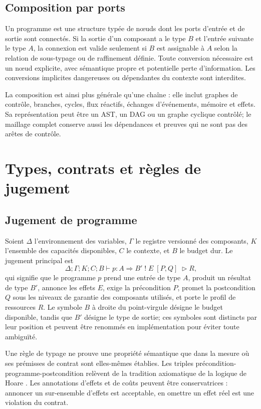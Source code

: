 \documentclass[11pt,a4paper,openany]{book}
\theoremstyle{definition}
\theoremstyle{plain}
\theoremstyle{remark}
\begin{document}
\section{Composition par ports}
Un programme est une structure typée de nœuds dont les ports d'entrée et de sortie sont connectés. Si la sortie d'un composant a le type $B$ et l'entrée suivante le type $A$, la connexion est valide seulement si $B$ est assignable à $A$ selon la relation de sous-typage ou de raffinement définie. Toute conversion nécessaire est un nœud explicite, avec sémantique propre et potentielle perte d'information. Les conversions implicites dangereuses ou dépendantes du contexte sont interdites.

La composition est ainsi plus générale qu'une chaîne : elle inclut graphes de contrôle, branches, cycles, flux réactifs, échanges d'événements, mémoire et effets. Sa représentation peut être un AST, un DAG ou un graphe cyclique contrôlé; le maillage complet conserve aussi les dépendances et preuves qui ne sont pas des arêtes de contrôle.

\chapter{Types, contrats et règles de jugement}
\section{Jugement de programme}
Soient $\Delta$ l'environnement des variables, $\Gamma$ le registre versionné des composants, $K$ l'ensemble des capacités disponibles, $C$ le contexte, et $B$ le budget dur. Le jugement principal est
\[
\Delta;\Gamma;K;C;B\vdash p:A\Rightarrow B'\;!\;E\;[P,Q]\;\triangleright R,
\]
qui signifie que le programme $p$ prend une entrée de type $A$, produit un résultat de type $B'$, annonce les effets $E$, exige la précondition $P$, promet la postcondition $Q$ sous les niveaux de garantie des composants utilisés, et porte le profil de ressources $R$. Le symbole $B$ à droite du point-virgule désigne le budget disponible, tandis que $B'$ désigne le type de sortie; ces symboles sont distincts par leur position et peuvent être renommés en implémentation pour éviter toute ambiguïté.

Une règle de typage ne prouve une propriété sémantique que dans la mesure où ses prémisses de contrat sont elles-mêmes établies. Les triples précondition-programme-postcondition relèvent de la tradition axiomatique de la logique de Hoare \cite{Hoare1969}. Les annotations d'effets et de coûts peuvent être conservatrices : annoncer un sur-ensemble d'effets est acceptable, en omettre un effet réel est une violation du contrat.
\end{document}
